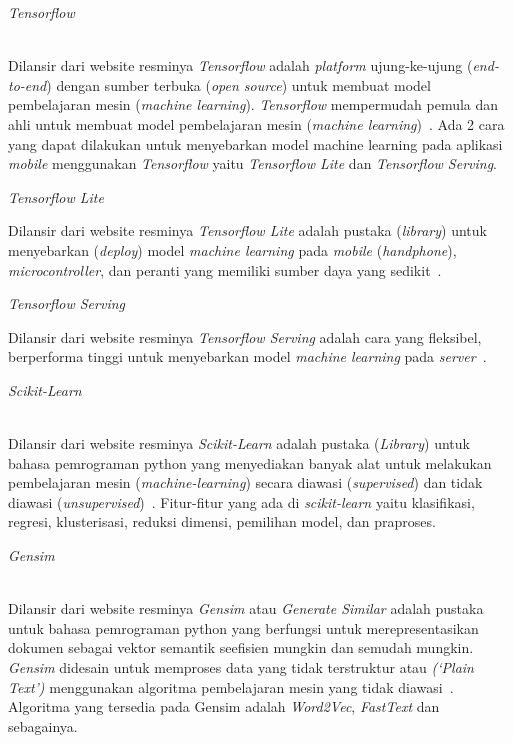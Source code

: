 \begin{itemize}
      {\bfseries \item \emph{Tensorflow}}\\
      Dilansir dari website resminya \emph{Tensorflow} adalah \emph{platform} ujung-ke-ujung (\emph{end-to-end})
      dengan sumber terbuka (\emph{open source}) untuk membuat model pembelajaran
      mesin (\emph{machine learning}). \emph{Tensorflow} mempermudah pemula dan ahli untuk membuat model
      pembelajaran mesin (\emph{machine learning})~\citep{tensorflow2015-whitepaper}. Ada 2 cara yang
      dapat dilakukan untuk menyebarkan model machine learning pada aplikasi \emph{mobile} menggunakan
      \emph{Tensorflow} yaitu \emph{Tensorflow Lite} dan \emph{Tensorflow Serving}.

      \begin{itemize}
            {\bfseries \item \emph{Tensorflow Lite}} Dilansir dari website resminya \emph{Tensorflow Lite}
            adalah pustaka (\emph{library}) untuk menyebarkan (\emph{deploy}) model \emph{machine learning} pada \emph{mobile}
            (\emph{handphone}), \emph{microcontroller}, dan peranti yang memiliki sumber daya yang
            sedikit~\citep{tensorflow2015-whitepaper}.

            {\bfseries \item \emph{Tensorflow Serving}} Dilansir dari website resminya \emph{Tensorflow Serving}
            adalah cara yang fleksibel, berperforma tinggi untuk menyebarkan model \emph{machine learning}
            pada \emph{server}~\citep{tensorflow2015-whitepaper}.
      \end{itemize}

      {\bfseries \item \emph{Scikit-Learn}}\\
      Dilansir dari website resminya \emph{Scikit-Learn} adalah pustaka (\emph{Library}) untuk bahasa pemrograman
      python yang menyediakan banyak alat untuk melakukan pembelajaran mesin (\emph{machine-learning}) secara
      diawasi (\emph{supervised}) dan tidak diawasi (\emph{unsupervised})~\citep{scikit-learn}. Fitur-fitur
      yang ada di \emph{scikit-learn} yaitu klasifikasi, regresi, klusterisasi, reduksi dimensi,
      pemilihan model, dan praproses.

      {\bfseries \item \emph{Gensim}}\\
      Dilansir dari website resminya \emph{Gensim} atau \emph{Generate Similar} adalah pustaka untuk bahasa
      pemrograman python yang berfungsi untuk merepresentasikan dokumen sebagai vektor semantik seefisien mungkin dan semudah
      mungkin. \emph{Gensim} didesain untuk memproses data yang tidak terstruktur atau \emph{(`Plain Text')}
      menggunakan algoritma pembelajaran mesin yang tidak diawasi~\citep{rehurek_lrec}. Algoritma yang
      tersedia pada Gensim adalah \emph{Word2Vec}, \emph{FastText} dan sebagainya.


\end{itemize}
